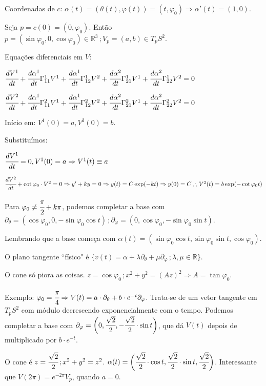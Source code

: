 \documentclass[10pt,a4paper]{article}
\begin{document}
		Coordenadas de $c$: $\alpha(t) = (\theta(t), \varphi(t)) = (t, \varphi_0) \Rightarrow \alpha'(t) = (1, 0)$.

		Seja $p = c(0) = (0, \varphi_0)$. Ent\~ao $p = (\sin \varphi_0, 0, \cos \varphi_0) \in \mathbb{R}^3\,; V_p = (a, b) \in T_pS^2$.

		Equa\c{c}\~oes diferenciais em $V$:

		$\cfrac{dV^1}{dt} + \cfrac{d\alpha^1}{dt} \Gamma_{11}^1 V^1  + \cfrac{d\alpha^1}{dt} \Gamma_{12}^1 V^2  + \cfrac{d\alpha^2}{dt} \Gamma_{21}^1 V^1  + \cfrac{d\alpha^2}{dt} \Gamma_{22}^1 V^2 = 0$

		$\cfrac{dV^2}{dt} + \cfrac{d\alpha^1}{dt} \Gamma_{11}^2 V^1  + \cfrac{d\alpha^1}{dt} \Gamma_{12}^2 V^2  + \cfrac{d\alpha^2}{dt} \Gamma_{21}^2 V^1  + \cfrac{d\alpha^2}{dt} \Gamma_{22}^2 V^2 = 0$

		In\'icio em: $V^1(0) = a, V^2(0) = b$.

		Substitu\'imos:

		$\cfrac{dV^1}{dt} = 0, V^1(0) = a \Rightarrow V^1(t) \equiv a$

		$\cfrac{dV^2}{dt} + \cot \varphi_0 \cdot V^2 = 0 \Rightarrow y' + ky = 0 \Rightarrow y(t) = C \exp(-kt) \Rightarrow y(0) = C \therefore V^2(t) = b \exp (-\cot \varphi_0 t)$

		Para $\varphi_0 \ne \cfrac{\pi}{2} + k\pi$, podemos completar a base com $\partial_\theta = (\cos \varphi_0, 0, -\sin \varphi_0 \cos t)\,; \partial_\varphi = (0, \cos \varphi_0, -\sin \varphi_0 \sin t)$.

		Lembrando que a base come\c{c}a com $\alpha(t) = (\sin \varphi_0 \cos t, \sin \varphi_0 \sin t, \cos \varphi_0)$.

		O plano tangente ``f\'isico" \'e $\{ v(t) = \alpha + \lambda \partial_\theta + \mu \partial_\varphi \,; \lambda, \mu \in \mathbb{R} \}$.

		O cone s\'o piora as coisas. $z = \cos \varphi_0\,; x^2 + y^2 = (A z)^2 \Rightarrow A = \tan \varphi_0$.

		Exemplo: $\varphi_0 = \cfrac{\pi}{4} \Rightarrow V(t) = a \cdot \partial_\theta + b \cdot e^{-t} \partial_\varphi$. Trata-se de um vetor tangente em $T_pS^2$ com m\'odulo decrescendo exponencialmente com o tempo. Podemos completar a base com $\partial_\varphi = \bigg(0, \cfrac{\sqrt 2}{2}, -\cfrac{\sqrt 2}{2} \cdot \sin t\bigg)$, que d\'a $V(t)$ depois de multiplicado por $b \cdot e^{-t}$.

		O cone \'e $z = \cfrac{\sqrt 2}{2}\,; x^2 + y^2 = z^2$. $\alpha(t) = \bigg(\cfrac{\sqrt 2}{2}\cdot \cos t, \cfrac{\sqrt 2}{2}\cdot \sin t, \cfrac{\sqrt 2}{2}\bigg)$. Interessante que $V(2\pi) = e^{-2\pi} V_p$, quando $a = 0$.
\end{document}
